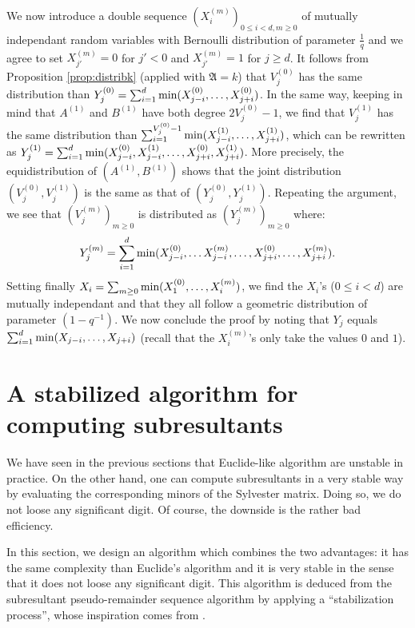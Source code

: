 \documentclass{jT}
\numberwithin{equation}{section}
\theoremstyle{definition}
\renewcommand{\min}{\text{\rm min}}
\newcommand{\ring}{\mathfrak A}
\begin{document}
We now introduce a double sequence $(X_i^{(m)})_{0 \leq i < d, m 
\geq 0}$ of mutually independant random variables with Bernoulli
distribution of parameter $\frac 1 q$ and we agree to set 
$X_{j'}^{(m)} = 0$ for $j' < 0$ and $X_{j'}^{(m)} = 1$ for $j \geq d$.
It follows from Proposition \ref{prop:distribk} (applied with $\ring = 
k$) that $V_j^{(0)}$ has the same distribution than 
$Y_j^{(0)} = \sum_{i=1}^d \min(X_{j-i}^{(0)}, \ldots, X_{j+i}^{(0)})$.
In the same way, keeping in mind that $A^{(1)}$ and $B^{(1)}$ have both 
degree $2V_j^{(0)} - 1$, we find that $V_j^{(1)}$ has the same 
distribution than $\sum_{i=1}^{V_j^{(0)} - 1} \min(X_{j-i}^{(1)}, 
\ldots, X_{j+i}^{(1)})$, which can be rewritten as
$Y_j^{(1)} = \sum_{i=1}^d \min(X_{j-i}^{(0)}, X_{j-i}^{(1)}, \ldots, 
X_{j+i}^{(0)}, X_{j+i}^{(1)})$. More precisely,
the equidistribution of $(A^{(1)}, B^{(1)})$ shows that the 
joint distribution $(V_j^{(0)}, V_j^{(1)})$ is the same as that
of $(Y_j^{(0)}, Y_j^{(1)})$. Repeating the argument, we see that
$(V_j^{(m)})_{m \geq 0}$ is distributed as $(Y_j^{(m)})_{m \geq 0}$
where:
$$Y_j^{(m)} = \sum_{i=1}^d \min(X_{j-i}^{(0)}, \ldots X_{j-i}^{(m)}, 
\ldots, X_{j+i}^{(0)}, \ldots, X_{j+i}^{(m)}).$$
Setting finally $X_i = \sum_{m \geq 0} \min(X_1^{(0)}, \ldots, 
X_i^{(m)})$, we find the $X_i$'s ($0 \leq i < d$) are mutually 
independant and that they all follow a geometric distribution of 
parameter $(1 - q^{-1})$. We now conclude the proof by noting that 
$Y_j$ equals $\sum_{i=1}^d \min(X_{j-i}, \ldots, X_{j+i})$ (recall
that the $X_i^{(m)}$'s only take the values $0$ and $1$).

\section{A stabilized algorithm for computing subresultants}
\label{sec:stable}

We have seen in the previous sections that Euclide-like algorithm are 
unstable in practice. On the other hand, one can compute subresultants 
in a very stable way by evaluating the corresponding minors of the 
Sylvester matrix. Doing so, we do not loose any significant digit. Of 
course, the downside is the rather bad efficiency.

In this section, we design an algorithm which combines the two
advantages: it has the same complexity than Euclide's algorithm
and it is very stable in the sense that it does not loose any
significant digit. 
This algorithm is deduced from the subresultant pseudo-remainder
sequence algorithm by applying a ``stabilization process'', whose 
inspiration comes from \cite{padicprec}.
\end{document}
